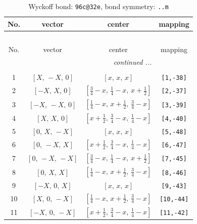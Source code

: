 \documentclass[fleqn,8pt]{jsarticle}
\begin{document}
\begin{longtable}{cccc}
\caption{Wyckoff bond: {\tt 96c@32e}, bond symmetry: {\tt ..m}}
 \\
 \hline \hline
No. & vector & center & mapping \\ \hline \endfirsthead

\multicolumn{3}{l}{\tablename\ \thetable{}} \\
 \hline \hline
No. & vector & center & mapping \\ \hline \endhead

 \hline \hline
\multicolumn{3}{r}{\footnotesize\it continued ...} \\ \endfoot

 \hline \hline
\multicolumn{3}{r}{} \\ \endlastfoot

1 & $\left[ X,\, - X,\, 0 \right]$ & $\left[ x,\, x,\, x \right]$ & {\tt [1,-38]} \\ \hline
2 & $\left[ - X,\, X,\, 0 \right]$ & $\left[ \frac{3}{4} - x,\, \frac{1}{4} - x,\, x + \frac{1}{2} \right]$ & {\tt [2,-37]} \\ \hline
3 & $\left[ - X,\, - X,\, 0 \right]$ & $\left[ \frac{1}{4} - x,\, x + \frac{1}{2},\, \frac{3}{4} - x \right]$ & {\tt [3,-39]} \\ \hline
4 & $\left[ X,\, X,\, 0 \right]$ & $\left[ x + \frac{1}{2},\, \frac{3}{4} - x,\, \frac{1}{4} - x \right]$ & {\tt [4,-40]} \\ \hline
5 & $\left[ 0,\, X,\, - X \right]$ & $\left[ x,\, x,\, x \right]$ & {\tt [5,-48]} \\ \hline
6 & $\left[ 0,\, - X,\, X \right]$ & $\left[ x + \frac{1}{2},\, \frac{3}{4} - x,\, \frac{1}{4} - x \right]$ & {\tt [6,-47]} \\ \hline
7 & $\left[ 0,\, - X,\, - X \right]$ & $\left[ \frac{3}{4} - x,\, \frac{1}{4} - x,\, x + \frac{1}{2} \right]$ & {\tt [7,-45]} \\ \hline
8 & $\left[ 0,\, X,\, X \right]$ & $\left[ \frac{1}{4} - x,\, x + \frac{1}{2},\, \frac{3}{4} - x \right]$ & {\tt [8,-46]} \\ \hline
9 & $\left[ - X,\, 0,\, X \right]$ & $\left[ x,\, x,\, x \right]$ & {\tt [9,-43]} \\ \hline
10 & $\left[ X,\, 0,\, - X \right]$ & $\left[ \frac{1}{4} - x,\, x + \frac{1}{2},\, \frac{3}{4} - x \right]$ & {\tt [10,-44]} \\ \hline
11 & $\left[ - X,\, 0,\, - X \right]$ & $\left[ x + \frac{1}{2},\, \frac{3}{4} - x,\, \frac{1}{4} - x \right]$ & {\tt [11,-42]} \\ \hline

\end{longtable}
\end{document}
